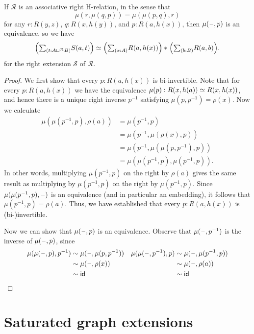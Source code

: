 \begin{cor}
If $\mathcal{R}$ is an associative right H-relation, in the sense that
\begin{equation*}
\mu(r,\mu(q,p))=\mu(\mu(p,q),r)
\end{equation*}
for any $r:R(y,z)$, $q:R(x,h(y))$, and $p:R(a,h(x))$, then $\mu(\mathord{\hspace{1pt}\text{--}\hspace{1pt}},p)$ is an equivalence, so we have
\begin{equation*}
\eqv{\Big(\sm{t:A\sqcup^{\mathcal{R}} B}S(a,t)\Big)}{\join{\Big(\sm{x:A}R(a,h(x))\Big)}{\Big(\sm{b:B}R(a,b)\Big)}}.
\end{equation*}
for the right extension $\mathcal{S}$ of $\mathcal{R}$.
\end{cor}

\begin{proof}
We first show that every $p:R(a,h(x))$ is bi-invertible. Note that for every $p:R(a,h(x))$ we have the equivalence $\mu(p):R(x,h(a))\simeq R(x,h(x))$, and hence there is a unique right inverse $p^{-1}$ satisfying $\mu(p,p^{-1})=\rho(x)$. Now we calculate
\begin{align*}
\mu(\mu(p^{-1},p),\rho(a)) & = \mu(p^{-1},p) \\
& = \mu(p^{-1},\mu(\rho(x),p)) \\
& = \mu(p^{-1},\mu(\mu(p,p^{-1}),p)) \\
& = \mu(\mu(p^{-1},p),\mu(p^{-1},p)).
\end{align*}
In other words, multiplying $\mu(p^{-1},p)$ on the right by $\rho(a)$ gives the same result as multiplying by $\mu(p^{-1},p)$ on the right by $\mu(p^{-1},p)$. Since $\mu(\mu(p^{-1},p),\mathord{\hspace{1pt}\text{--}\hspace{1pt}})$ is an equivalence (and in particular an embedding), it follows that $\mu(p^{-1},p)=\rho(a)$. Thus, we have established that every $p:R(a,h(x))$ is (bi-)invertible. 

Now we can show that $\mu(\mathord{\hspace{1pt}\text{--}\hspace{1pt}},p)$ is an equivalence. Observe that $\mu(\mathord{\hspace{1pt}\text{--}\hspace{1pt}},p^{-1})$ is the inverse of $\mu(\mathord{\hspace{1pt}\text{--}\hspace{1pt}},p)$, since
\begin{align*}
\mu(\mu(\mathord{\hspace{1pt}\text{--}\hspace{1pt}},p),p^{-1}) & \sim \mu(\mathord{\hspace{1pt}\text{--}\hspace{1pt}},\mu(p,p^{-1})) & \mu(\mu(\mathord{\hspace{1pt}\text{--}\hspace{1pt}},p^{-1}),p) & \sim \mu(\mathord{\hspace{1pt}\text{--}\hspace{1pt}},\mu(p^{-1},p)) \\
& \sim \mu(\mathord{\hspace{1pt}\text{--}\hspace{1pt}},\rho(x)) & & \sim \mu(\mathord{\hspace{1pt}\text{--}\hspace{1pt}},\rho(a)) \\
& \sim \mathsf{id}_{} & & \sim \mathsf{id}_{} \qedhere
\end{align*}
\end{proof}

\section{Saturated graph extensions}

